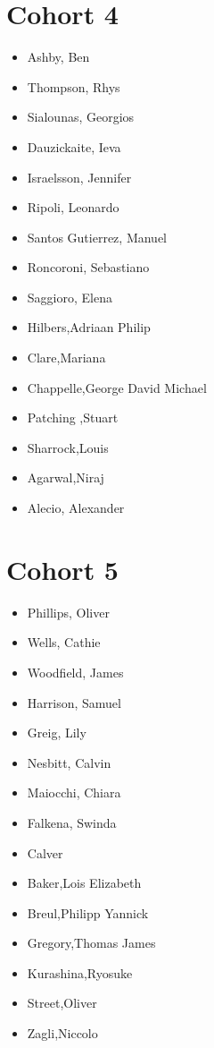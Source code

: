\documentclass{article}
\begin{document}
\section*{Cohort 4}
\begin{itemize}
    \item Ashby, Ben 
    \item Thompson, Rhys \cite{thompson2020accounting, thompsonpro, bloch2021constraining}
    \item Sialounas, Georgios
    \item Dauzickaite, Ieva \cite{dauvzickaite2020spectral}
    \item Israelsson, Jennifer \cite{israelsson2020spatial}
    \item Ripoli, Leonardo
    \item Santos Gutierrez, Manuel \cite{gutierrez2020response}
    \item Roncoroni, Sebastiano
    \item Saggioro, Elena \cite{saggioro2019quantifying, saggioro2020reconstructing}
    \item Hilbers,Adriaan Philip \cite{hilbers2019importance, bloomfield2021importance, hilbers2020efficient}
    \item Clare,Mariana \cite{clare2021hydro, clare2021assessing}
    \item Chappelle,George David Michael
    \item Patching ,Stuart
    \item Sharrock,Louis
    \item Agarwal,Niraj \cite{ryzhov2020data, ryzhov2019data}
    \item Alecio, Alexander 
\end{itemize}

\section*{Cohort 5}
\begin{itemize}
    \item Phillips, Oliver 
    \item Wells, Cathie \cite{wells2021reducing}
    \item Woodfield, James 
    \item Harrison, Samuel
    \item Greig, Lily
    \item Nesbitt, Calvin
    \item Maiocchi, Chiara
    \item Falkena, Swinda \cite{falkena2021delay, falkena2020revisiting, falkena2019derivation}
    \item Calver
    \item Baker,Lois Elizabeth
    \item Breul,Philipp Yannick
    \item Gregory,Thomas James
    \item Kurashina,Ryosuke
    \item Street,Oliver
    \item Zagli,Niccolo \cite{lucarini2020response}
\end{itemize}

\end{document}
